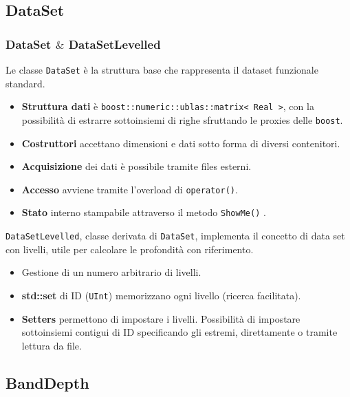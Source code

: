 \documentclass[9pt]{beamer}
\begin{document}
\subsection{DataSet}
\begin{frame}
 \frametitle{\ttfamily DataSet $\&$ DataSetLevelled}
Le classe \texttt{DataSet} \`e la struttura base che rappresenta il dataset funzionale standard.\\

\begin{itemize}
 \item \textbf{Struttura dati} \`e \texttt{boost::numeric::ublas::matrix< Real >}, con la possibilit\`a di estrarre sottoinsiemi di righe
						  sfruttando le proxies delle \texttt{boost}.
 \item \textbf{Costruttori} accettano dimensioni e dati sotto forma di diversi contenitori.
 \item \textbf{Acquisizione} dei dati \`e possibile tramite files esterni.
 \item \textbf{Accesso} avviene tramite l'overload di \texttt{operator()}.
 \item \textbf{Stato} interno stampabile attraverso il metodo \texttt{ShowMe()} .
\end{itemize}
\texttt{DataSetLevelled}, classe derivata di \texttt{DataSet}, implementa il concetto di data set
con livelli, utile per calcolare le profondit\`a con riferimento.\\
\begin{itemize}
 \item Gestione di un numero arbitrario di livelli.
 \item \textbf{std::set} di ID (\texttt{UInt}) memorizzano ogni livello (ricerca facilitata).
 \item \textbf{Setters} permettono di impostare i livelli. Possibilit\`a di impostare sottoinsiemi contigui di ID specificando gli estremi, direttamente o tramite lettura da file.
\end{itemize}


\end{frame}


\subsection{BandDepth}
\end{document}
